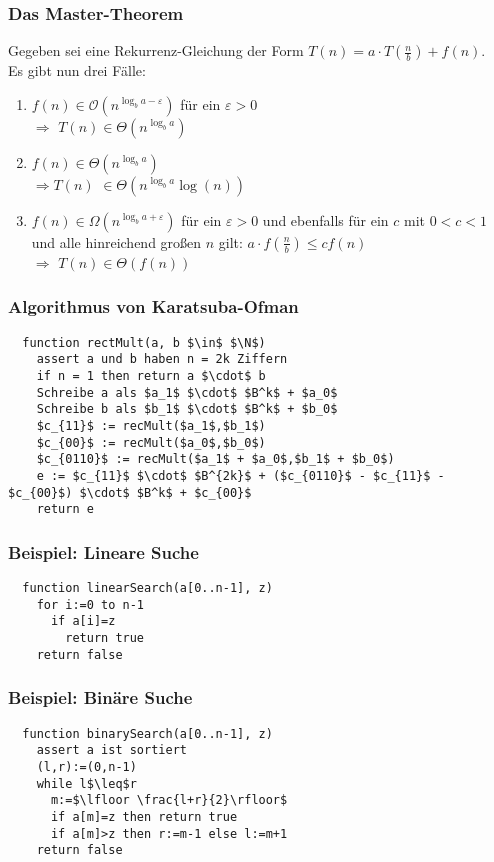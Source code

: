 \begin{frame}
\frametitle{Das Master-Theorem}
Gegeben sei eine Rekurrenz-Gleichung der Form $T(n) = a \cdot T(\frac{n}{b}) + f(n)$.\\
Es gibt nun drei Fälle:
\begin{enumerate}
\item $f(n) \in \mathcal{O}\left( n^{\log_b a - \varepsilon} \right)$ 
für ein $\varepsilon>0$\\ $\Rightarrow$ $T(n) \in \Theta\left( n^{\log_b a} \right)$ \pause
\item $f(n) \in \Theta\left( n^{\log_b a} \right)$\\ $\Rightarrow T(n)$ $\in \Theta\left( n^{\log_b a} \log(n)\right)$ \pause
\item $f(n) \in \Omega\left( n^{\log_b a + \varepsilon} \right)$ für ein $\varepsilon>0$
und ebenfalls für ein $c$ mit $0 < c < 1$ und alle hinreichend großen $n$ gilt:
$a \cdot f( \textstyle \frac{n}{b} ) \leq c f(n)$\\ $\Rightarrow$ $T(n) \in \Theta(f(n))$
\end{enumerate}
\end{frame}

\begin{frame}[fragile]
\frametitle{Algorithmus von Karatsuba-Ofman}
\begin{lstlisting}
  function rectMult(a, b $\in$ $\N$)
    assert a und b haben n = 2k Ziffern
    if n = 1 then return a $\cdot$ b
    Schreibe a als $a_1$ $\cdot$ $B^k$ + $a_0$
    Schreibe b als $b_1$ $\cdot$ $B^k$ + $b_0$
    $c_{11}$ := recMult($a_1$,$b_1$)
    $c_{00}$ := recMult($a_0$,$b_0$)
    $c_{0110}$ := recMult($a_1$ + $a_0$,$b_1$ + $b_0$)
    e := $c_{11}$ $\cdot$ $B^{2k}$ + ($c_{0110}$ - $c_{11}$ - $c_{00}$) $\cdot$ $B^k$ + $c_{00}$
    return e
\end{lstlisting}%
\end{frame}

\begin{frame}[fragile]
\frametitle{Beispiel: Lineare Suche}
\begin{lstlisting}
  function linearSearch(a[0..n-1], z)
    for i:=0 to n-1
      if a[i]=z
      	return true
    return false
\end{lstlisting}%
\end{frame}

\begin{frame}[fragile]
\frametitle{Beispiel: Binäre Suche}
\begin{lstlisting}
  function binarySearch(a[0..n-1], z)
    assert a ist sortiert
    (l,r):=(0,n-1)
    while l$\leq$r
      m:=$\lfloor \frac{l+r}{2}\rfloor$
      if a[m]=z then return true
      if a[m]>z then r:=m-1 else l:=m+1
    return false
\end{lstlisting}%
\end{frame}

